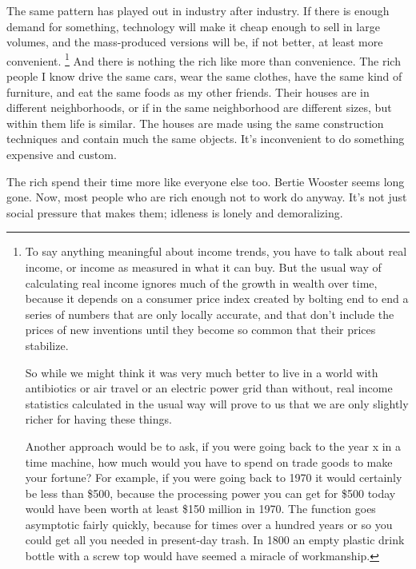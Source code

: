 The same pattern has played out in industry after industry. If there is
enough demand for something, technology will make it cheap enough to
sell in large volumes, and the mass-produced versions will be, if not
better, at least more convenient. \footnote{To say anything meaningful about income trends, you have to
talk about real income, or income as measured in what it can buy. But
the usual way of calculating real income ignores much of the growth in
wealth over time, because it depends on a consumer price index created
by bolting end to end a series of numbers that are only locally
accurate, and that don't include the prices of new inventions until they
become so common that their prices stabilize.

So while we might think it was very much better to live in a world with
antibiotics or air travel or an electric power grid than without, real
income statistics calculated in the usual way will prove to us that we
are only slightly richer for having these things.

Another approach would be to ask, if you were going back to the year x
in a time machine, how much would you have to spend on trade goods to
make your fortune? For example, if you were going back to 1970 it would
certainly be less than \$500, because the processing power you can get
for \$500 today would have been worth at least \$150 million in 1970.
The function goes asymptotic fairly quickly, because for times over a
hundred years or so you could get all you needed in present-day trash.
In 1800 an empty plastic drink bottle with a screw top would have seemed
a miracle of workmanship.} And there is
nothing the rich like more than convenience. The rich people I know
drive the same cars, wear the same clothes, have the same kind of
furniture, and eat the same foods as my other friends. Their houses are
in different neighborhoods, or if in the same neighborhood are different
sizes, but within them life is similar. The houses are made using the
same construction techniques and contain much the same objects. It's
inconvenient to do something expensive and custom.

The rich spend their time more like everyone else too. Bertie Wooster
seems long gone. Now, most people who are rich enough not to work do
anyway. It's not just social pressure that makes them; idleness is
lonely and demoralizing.

